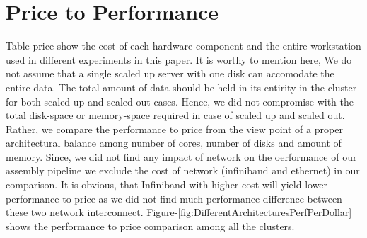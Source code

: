\documentclass[conference]{IEEEtran}
\begin{document}

\section {Price to Performance} \label{PriceToPerformance}
Table-price show the cost of each hardware component and the entire workstation used in different experiments in this paper.
It is worthy to mention here, We do not assume that a single scaled up server with one disk can accomodate the entire data.
The total amount of data should be held in its entirity in the cluster for both scaled-up and scaled-out cases.
Hence, we did not compromise with the total disk-space or memory-space required in case of scaled up and scaled out.
Rather, we compare the performance to price from the view point of a proper architectural balance among number of cores, number of disks and amount of memory.
Since, we did not find any impact of network on the oerformance of our assembly pipeline we exclude the cost of network (infiniband and ethernet) in our comparison. It is obvious, that Infiniband with higher cost will yield lower performance to price as we did not find much performance difference between these two network interconnect. 
Figure-\ref{fig:DifferentArchitecturesPerfPerDollar} shows the performance to price comparison among all the clusters.
\end{document}
